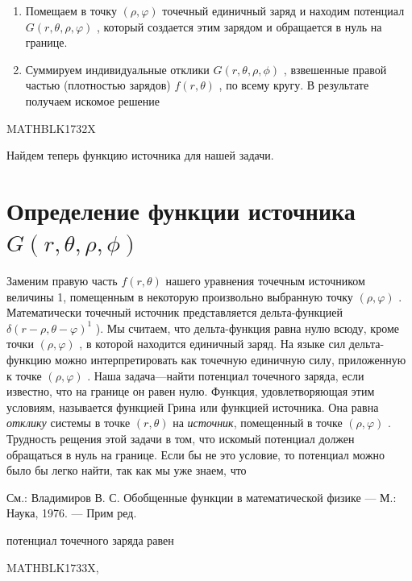 \documentclass[
]{article}
\begin{document}
\begin{enumerate}
\def\labelenumi{\arabic{enumi}.}
\item
  Помещаем в точку \((\rho, \varphi)\) точечный единичный заряд и
  находим потенциал \(G(r, \theta, \rho, \varphi)\) , который создается
  этим зарядом и обращается в нуль на границе.
\item
  Суммируем индивидуальные отклики \(G(r, \theta, \rho, \phi)\) ,
  взвешенные правой частью (плотностью зарядов) \(f(r, \theta)\) , по
  всему кругу. В результате получаем искомое решение
\end{enumerate}

MATHBLK1732X

Найдем теперь функцию источника для нашей задачи.

\section{\texorpdfstring{Определение функции источника
\(G(r, \theta, \rho, \phi)\)}{Определение функции источника G(r, \textbackslash theta, \textbackslash rho, \textbackslash phi)}}\label{ux43eux43fux440ux435ux434ux435ux43bux435ux43dux438ux435-ux444ux443ux43dux43aux446ux438ux438-ux438ux441ux442ux43eux447ux43dux438ux43aux430-gr-theta-rho-phi}

Заменим правую часть \(f(r,\theta)\) нашего уравнения точечным
источником величины 1, помещенным в некоторую произвольно выбранную
точку \((\rho, \varphi)\) . Математически точечный источник
представляется дельта-функцией \(\delta(r-\rho, \theta-\varphi)^1\) ).
Мы считаем, что дельта-функция равна нулю всюду, кроме точки
\((\rho, \varphi)\) , в которой находится единичный заряд. На языке сил
дельта-функцию можно интерпретировать как точечную единичную силу,
приложенную к точке \((\rho, \varphi)\) . Наша задача---найти потенциал
точечного заряда, если известно, что на границе он равен нулю. Функция,
удовлетворяющая этим условиям, называется функцией Грина или функцией
источника. Она равна \emph{отклику} системы в точке \((r, \theta)\) на
\emph{источник}, помещенный в точке \((\rho, \varphi)\) . Трудность
рещения этой задачи в том, что искомый потенциал должен обращаться в
нуль на границе. Если бы не это условие, то потенциал можно было бы
легко найти, так как мы уже знаем, что

См.: Владимиров В. С. Обобщенные функции в математической физике --- М.:
Наука, 1976. --- Прим ред.

потенциал точечного заряда равен

MATHBLK1733X,
\end{document}
